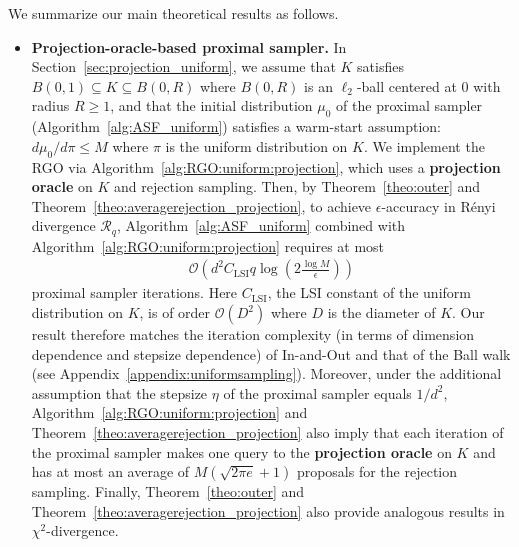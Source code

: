 \documentclass[11pt,letterpaper]{article}
\newcommand{\brac}[1]{\left( #1\right)}
\begin{document}
We summarize our main theoretical results as follows.
\begin{itemize}
    \item \textbf{Projection-oracle-based proximal sampler.}
    In Section~\ref{sec:projection_uniform}, we assume that $K$ satisfies $B(0,1)\subseteq K\subseteq B(0,R)$ where $B(0,R)$ is an $\ell_2$-ball centered at $0$ with radius $R \ge 1$, and that the initial distribution $\mu_0$ of the proximal sampler (Algorithm~\ref{alg:ASF_uniform}) satisfies a warm-start assumption: $d\mu_0/d\pi\leq M$ where $\pi$ is the uniform distribution on $K$. We implement the RGO via Algorithm~\ref{alg:RGO:uniform:projection}, which uses a \textbf{projection oracle} on $K$ and rejection sampling. Then, by Theorem~\ref{theo:outer} and Theorem~\ref{theo:averagerejection_projection}, to achieve $\epsilon$-accuracy in R\'{e}nyi divergence $\mathcal{R}_q$, Algorithm~\ref{alg:ASF_uniform} combined with Algorithm~\ref{alg:RGO:uniform:projection} requires at most
    \begin{align}
    \label{complexity}
       \mathcal{O}\brac{d^2{C_{\mathrm{LSI}}q\log \brac{2\frac{\log M}{\epsilon}} }}
    \end{align}
    proximal sampler iterations. Here $C_{\mathrm{LSI}}$, the LSI constant of the uniform distribution on $K$, is of order $\mathcal{O}(D^2)$ where $D$ is the diameter of $K$. Our result therefore matches the iteration complexity (in terms of dimension dependence and stepsize dependence) of In-and-Out \cite[Theorem~27]{kook2024inandout} and that of the Ball walk (see Appendix~\ref{appendix:uniformsampling}). Moreover, under the additional assumption that the stepsize $\eta$ of the proximal sampler equals $1/d^2$, Algorithm~\ref{alg:RGO:uniform:projection} and Theorem~\ref{theo:averagerejection_projection} also imply that each iteration of the proximal sampler makes one query to the \textbf{projection oracle} on $K$ and has at most an average of $M(\sqrt{2\pi e}+1)$ proposals for the rejection sampling. Finally, Theorem~\ref{theo:outer} and Theorem~\ref{theo:averagerejection_projection} also provide analogous results in $\chi^2$-divergence.


\end{itemize}
\end{document}
